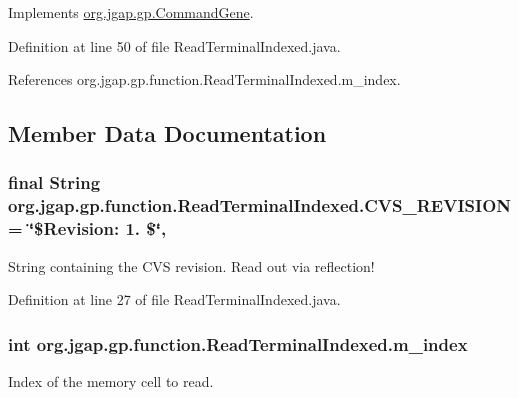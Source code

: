 Implements \hyperlink{classorg_1_1jgap_1_1gp_1_1_command_gene_a236141d99059da808afe7a9217e411c7}{org.\-jgap.\-gp.\-Command\-Gene}.



Definition at line 50 of file Read\-Terminal\-Indexed.\-java.



References org.\-jgap.\-gp.\-function.\-Read\-Terminal\-Indexed.\-m\-\_\-index.



\subsection{Member Data Documentation}
\hypertarget{classorg_1_1jgap_1_1gp_1_1function_1_1_read_terminal_indexed_a359b2265fb4b84a7a5dc0c71932575ba}{
\subsubsection[{C\-V\-S\-\_\-\-R\-E\-V\-I\-S\-I\-O\-N}]{\setlength{\rightskip}{0pt plus 5cm}final String org.\-jgap.\-gp.\-function.\-Read\-Terminal\-Indexed.\-C\-V\-S\-\_\-\-R\-E\-V\-I\-S\-I\-O\-N = \char`\"{}\$Revision\-: 1. \$\char`\"{}\hspace{0.3cm}{\ttfamily [static]}, {\ttfamily [private]}}}\label{classorg_1_1jgap_1_1gp_1_1function_1_1_read_terminal_indexed_a359b2265fb4b84a7a5dc0c71932575ba}
String containing the C\-V\-S revision. Read out via reflection! 

Definition at line 27 of file Read\-Terminal\-Indexed.\-java.

\hypertarget{classorg_1_1jgap_1_1gp_1_1function_1_1_read_terminal_indexed_aa3be1b7c8165c055b52e7a999e5296b2}{
\subsubsection[{m\-\_\-index}]{\setlength{\rightskip}{0pt plus 5cm}int org.\-jgap.\-gp.\-function.\-Read\-Terminal\-Indexed.\-m\-\_\-index\hspace{0.3cm}{\ttfamily [private]}}}\label{classorg_1_1jgap_1_1gp_1_1function_1_1_read_terminal_indexed_aa3be1b7c8165c055b52e7a999e5296b2}
Index of the memory cell to read. 

